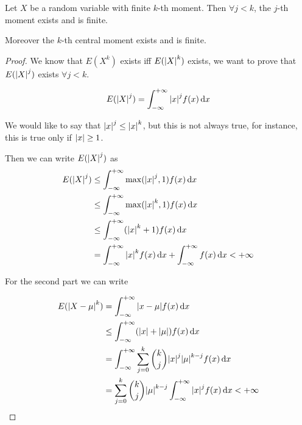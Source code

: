 \documentclass[14pt]{extarticle}
\begin{document}
\begin{theorem}
    Let $X$ be a random variable with finite $k$-th moment.
    Then $\forall j < k$, the $j$-th moment exists and is finite.

    Moreover the $k$-th central moment exists and is finite.
\end{theorem}

\begin{proof}
    We know that $E(X^k)$ exists iff $E(\abs{X}^k)$ exists, we want to prove that $E(\abs{X}^j)$ exists $\forall j < k$.

    \begin{equation}
        E(\abs{X}^j) = \int_{-\infty}^{+\infty} \abs{x}^j f(x) \dd{x}
    \end{equation}

    We would like to say that $\abs{x}^j \leq \abs{x}^k$, but this is not always true, for instance, this is true only if $\abs{x} \geq 1$.

    Then we can write $E(\abs{X}^j)$ as
    \begin{align}
        E(\abs{X}^j) & \leq \int_{-\infty}^{+\infty} \max(\abs{x}^j, 1) f(x) \dd{x}                                      \\
                     & \leq \int_{-\infty}^{+\infty} \max(\abs{x}^k, 1) f(x) \dd{x}                                      \\
                     & \leq \int_{-\infty}^{+\infty} (\abs{x}^k + 1) f(x) \dd{x}                                         \\
                     & = \int_{-\infty}^{+\infty} \abs{x}^k f(x) \dd{x} + \int_{-\infty}^{+\infty} f(x) \dd{x} < +\infty
    \end{align}

    For the second part we can write

    \begin{align}
        E(\abs{X - \mu}^k) & = \int_{-\infty}^{+\infty} \abs{x - \mu} f(x) \dd{x}                                                 \\
                           & \leq \int_{-\infty}^{+\infty} (\abs{x} + \abs{\mu}) f(x) \dd{x}                                      \\
                           & = \int_{-\infty}^{+\infty} \sum_{j=0}^k \binom{k}{j} \abs{x}^j \abs{\mu}^{k-j} f(x) \dd{x}           \\
                           & = \sum_{j=0}^k \binom{k}{j} \abs{\mu}^{k-j} \int_{-\infty}^{+\infty} \abs{x}^j f(x) \dd{x} < +\infty
    \end{align}
\end{proof}
\end{document}

